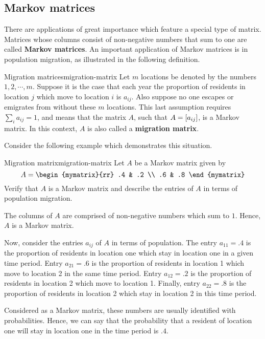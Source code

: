 \subsection{Markov matrices}

There are applications of great importance which feature a special type of matrix.  Matrices whose columns consist of non-negative numbers that sum to one are
called \textbf{Markov matrices}. An important application of Markov matrices is
in population migration, as illustrated in the following definition. 

\begin{definition}{Migration matrices}{migration-matrix}
Let $m$ locations be denoted by the numbers $1,2,\cdots ,m$. Suppose
it is the case that each year the proportion of residents in location
$j$ which move to location $i$ is $a_{ij}$. Also suppose no one
escapes or emigrates from without these $m$ locations. This last
assumption requires $\sum_{i}a_{ij}=1$, and means that the matrix $A$,
such that $A = \left[a_{ij} \right]$, is a Markov matrix. In this context,
$A$ is also called a \textbf{migration matrix}.
\end{definition}

Consider the following example which demonstrates this situation.

\begin{example}{Migration matrix}{migration-matrix}
Let $A$ be a Markov matrix given by 
\begin{equation*}
A = 
\begin{mymatrix}{rr}
.4 & .2 \\
.6 & .8
\end{mymatrix}
\end{equation*}
Verify that $A$ is a Markov matrix and describe the entries of $A$ in terms of population migration.
\end{example}

\begin{solution}
The columns of $A$ are comprised of non-negative numbers which sum to $1$. Hence, $A$ is a Markov matrix. 

Now, consider the entries $a_{ij}$ of $A$ in terms of population. The
entry $a_{11} = .4$ is the proportion of residents in location one
which stay in location one in a given time period.  Entry $a_{21} =
.6$ is the proportion of residents in location 1 which move to
location 2 in the same time period. Entry $a_{12} = .2$ is the
proportion of residents in location 2 which move to location
1. Finally, entry $a_{22} = .8$ is the proportion of residents in
location 2 which stay in location 2 in this time period.  

Considered as a Markov matrix, these numbers are usually identified
with probabilities. Hence, we can say that the probability that a
resident of location one will stay in location one in the time period
is $.4$.
\end{solution}

